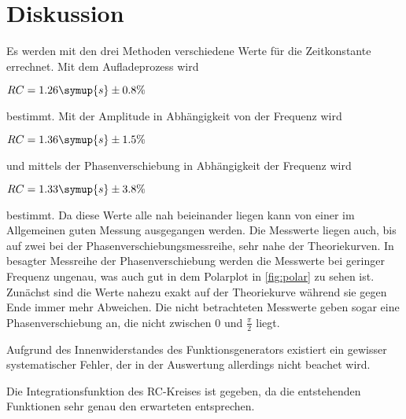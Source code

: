 \section{Diskussion}
\label{sec:Diskussion}

Es werden mit den drei Methoden verschiedene Werte für die Zeitkonstante errechnet.
Mit dem Aufladeprozess wird 

\begin{center}
    $RC = 1.26 \symup{s} \pm 0.8 \%$
\end{center}

bestimmt. Mit der Amplitude in Abhängigkeit von der Frequenz wird 

\begin{center}
    $RC = 1.36 \symup{s} \pm 1.5 \%$
\end{center}

und mittels der Phasenverschiebung in Abhängigkeit der Frequenz wird

\begin{center}
    $RC = 1.33 \symup{s} \pm 3.8\%$
\end{center}

bestimmt. Da diese Werte alle nah beieinander liegen kann von einer im Allgemeinen guten Messung ausgegangen werden.
Die Messwerte liegen auch, bis auf zwei bei der Phasenverschiebungsmessreihe, sehr nahe der Theoriekurven.
In besagter Messreihe der Phasenverschiebung werden die Messwerte bei geringer Frequenz ungenau, was auch gut in dem Polarplot in \autoref{fig:polar} zu sehen ist.
Zunächst sind die Werte nahezu exakt auf der Theoriekurve während sie gegen Ende immer mehr Abweichen. Die nicht betrachteten Messwerte geben sogar eine Phasenverschiebung an, die nicht zwischen $0$ und $\frac{\pi}{2}$ liegt.

Aufgrund des Innenwiderstandes des Funktionsgenerators existiert ein gewisser systematischer Fehler, der in der Auswertung allerdings nicht beachet wird.

Die Integrationsfunktion des RC-Kreises ist gegeben, da die entstehenden Funktionen sehr genau den erwarteten entsprechen.